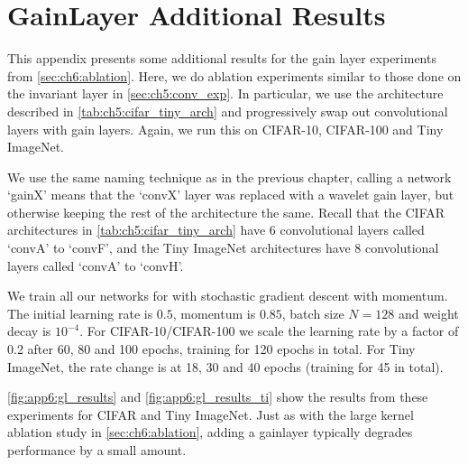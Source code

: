 \chapter{GainLayer Additional Results}\label{app:ch6:more_results}
\def \path {freqlearn/}
\def \imgpath {freqlearn/images}
This appendix presents some additional results for the gain layer experiments
from \autoref{sec:ch6:ablation}. Here, we do ablation experiments similar to
those done on the invariant layer in \autoref{sec:ch5:conv_exp}. In particular,
we use the architecture described in \autoref{tab:ch5:cifar_tiny_arch} and
progressively swap out convolutional layers with gain layers. 
Again, we run this on CIFAR-10, CIFAR-100 and Tiny ImageNet. 

We use the same naming technique as in the previous chapter, calling a network
`gainX' means that the `convX' layer was replaced with a wavelet gain layer, but
otherwise keeping the rest of the architecture the same. Recall that the
CIFAR architectures in \autoref{tab:ch5:cifar_tiny_arch} have 6 convolutional layers 
called `convA' to `convF', and the Tiny ImageNet architectures have 8
convolutional layers called `convA' to `convH'.

We train all our networks for with stochastic gradient descent with momentum.
The initial learning rate is $0.5$, momentum is $0.85$, batch size $N=128$ and
weight decay is $10^{-4}$. For CIFAR-10/CIFAR-100 we scale the learning rate by
a factor of 0.2 after 60, 80 and 100 epochs, training for 120 epochs in total.
For Tiny ImageNet, the rate change is at 18, 30 and 40 epochs (training for 45 in total).

\autoref{fig:app6:gl_results} and \autoref{fig:app6:gl_results_ti} show the results 
from these experiments for CIFAR and Tiny ImageNet. Just as with the large
kernel ablation study in \autoref{sec:ch6:ablation}, adding a gainlayer
typically degrades performance by a small amount.

\begin{figure}[t]
  \centering
  \\
  \label{fig:app6:gl_results}
\end{figure}


